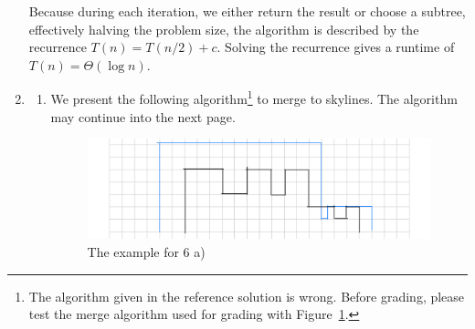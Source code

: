 \documentclass{article}
\begin{document}
\begin{enumerate}
    Because during each iteration, we either return the result or choose a subtree, effectively halving the problem size, the algorithm is described by the recurrence $T(n) = T(n/2) + c$. Solving the recurrence gives a runtime of $T(n) = \Theta(\log n)$.

    \item
    \begin{enumerate}[label=\alph*)]
        \item We present the following algorithm\footnote{The algorithm given in the reference solution is wrong. Before grading, please test the merge algorithm used for grading with Figure~\ref{fig:6a}.} to merge to skylines. The algorithm may continue into the next page.

        \begin{figure}[bt]
            \includegraphics[width=\linewidth]{img/5-6a-example.jpeg}
            \caption{The example for 6 a)}
            \label{fig:6a}
        \end{figure}
        

\end{enumerate}
\end{enumerate}
\end{document}
